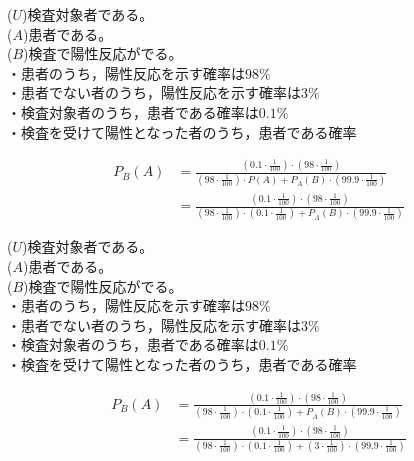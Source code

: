 \documentclass[aspectratio=169, dvipdfmx, 11pt]{beamer}
\begin{document}
\begin{frame}
($U$)検査対象者である。\\
($A$)患者である。\\
($B$)検査で陽性反応がでる。\\

・患者のうち，陽性反応を示す確率は$98\%$\\
・患者でない者のうち，陽性反応を示す確率は$3\%$\\
・検査対象者のうち，患者である確率は$0.1\%$\\
・検査を受けて陽性となった者のうち，患者である確率

\begin{align}
P_B(A)&=\frac{(0.1\cdot \frac{1}{100})\cdot (98\cdot \frac{1}{100})}{(98\cdot \frac{1}{100})\cdot P(A)+P_{\overline{A}}(B)\cdot (99.9\cdot \frac{1}{100})}\\
&=\frac{(0.1\cdot \frac{1}{100})\cdot (98\cdot \frac{1}{100})}{(98\cdot \frac{1}{100})\cdot(0.1\cdot \frac{1}{100})+P_{\overline{A}}(B)\cdot (99.9\cdot \frac{1}{100})}
\end{align}

\end{frame}



\begin{frame}
($U$)検査対象者である。\\
($A$)患者である。\\
($B$)検査で陽性反応がでる。\\

・患者のうち，陽性反応を示す確率は$98\%$\\
・患者でない者のうち，陽性反応を示す確率は$3\%$\\
・検査対象者のうち，患者である確率は$0.1\%$\\
・検査を受けて陽性となった者のうち，患者である確率

\begin{align}
P_B(A)&=\frac{(0.1\cdot \frac{1}{100})\cdot (98\cdot \frac{1}{100})}{(98\cdot \frac{1}{100})\cdot(0.1\cdot \frac{1}{100})+P_{\overline{A}}(B)\cdot (99.9\cdot \frac{1}{100})}\\
&=\frac{(0.1\cdot \frac{1}{100})\cdot (98\cdot \frac{1}{100})}{(98\cdot \frac{1}{100})\cdot(0.1\cdot \frac{1}{100})+(3\cdot \frac{1}{100})\cdot (99.9\cdot \frac{1}{100})}
\end{align}

\end{frame}
\end{document}
